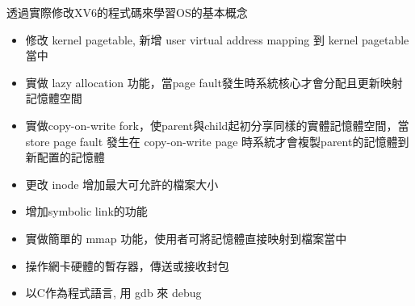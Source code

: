 {\begin{CJK*}{UTF8}{bsmi}透過實際修改XV6的程式碼來學習OS的基本概念\end{CJK*}} {} {}
\begin{itemize}
\setlength\topsep{-0.1em}
\setlength\parskip{-0.1em}
\setlength\parsep{-0.1em}
\setlength\itemsep{-0.1em}
  \item\begin{CJK*}{UTF8}{bsmi}修改 kernel pagetable, 新增 user virtual address mapping 到 kernel pagetable 當中\end{CJK*}  
  \item\begin{CJK*}{UTF8}{bsmi}實做 lazy allocation 功能，當page fault發生時系統核心才會分配且更新映射記憶體空間\end{CJK*} 
  \item\begin{CJK*}{UTF8}{bsmi}實做copy-on-write fork，使parent與child起初分享同樣的實體記憶體空間，當store page fault 發生在 copy-on-write page 時系統才會複製parent的記憶體到新配置的記憶體\end{CJK*} 
  \item\begin{CJK*}{UTF8}{bsmi}更改 inode 增加最大可允許的檔案大小\end{CJK*}
  \item\begin{CJK*}{UTF8}{bsmi}增加symbolic link的功能\end{CJK*}
  \item\begin{CJK*}{UTF8}{bsmi}實做簡單的 mmap 功能，使用者可將記憶體直接映射到檔案當中\end{CJK*}
  \item\begin{CJK*}{UTF8}{bsmi}操作網卡硬體的暫存器，傳送或接收封包\end{CJK*}
  \item\begin{CJK*}{UTF8}{bsmi}以C作為程式語言, 用 gdb 來 debug\end{CJK*}
\end{itemize}




